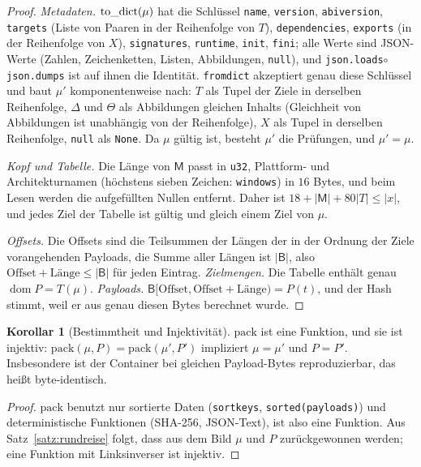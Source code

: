 \documentclass[a4paper,12pt,twoside]{report}
\DeclareRobustCommand{\_}{\ifmmode\mbox{\textunderscore}\else\textunderscore\allowbreak{}\fi}
\theoremstyle{definition}
\newtheorem{korollar}{Korollar}[chapter]
\newcommand{\dom}{\operatorname{dom}}
\begin{document}
\begin{proof}
	\emph{Metadaten.} $\mathrm{to\_dict}(\mu)$ hat die Schlüssel \texttt{name}, \texttt{version}, \texttt{abi\_version}, \texttt{targets} (Liste von Paaren in der Reihenfolge von $T$), \texttt{dependencies}, \texttt{exports} (in der Reihenfolge von $X$), \texttt{signatures}, \texttt{runtime}, \texttt{init}, \texttt{fini}; alle Werte sind JSON-Werte (Zahlen, Zeichenketten, Listen, Abbildungen, \texttt{null}), und \texttt{json.loads}$\circ$\texttt{json.dumps} ist auf ihnen die Identität. \texttt{from\_dict} akzeptiert genau diese Schlüssel und baut $\mu'$ komponentenweise nach: $T$ als Tupel der Ziele in derselben Reihenfolge, $\Delta$ und $\Theta$ als Abbildungen gleichen Inhalts (Gleichheit von Abbildungen ist unabhängig von der Reihenfolge), $X$ als Tupel in derselben Reihenfolge, \texttt{null} als \texttt{None}. Da $\mu$ gültig ist, besteht $\mu'$ die Prüfungen, und $\mu'=\mu$.

	\emph{Kopf und Tabelle.} Die Länge von $\mathsf M$ passt in \texttt{u32}, Plattform- und Architekturnamen (höchstens sieben Zeichen: \texttt{windows}) in $16$ Bytes, und beim Lesen werden die aufgefüllten Nullen entfernt. Daher ist $18+|\mathsf M|+80|T|\le|x|$, und jedes Ziel der Tabelle ist gültig und gleich einem Ziel von $\mu$.

	\emph{Offsets.} Die Offsets sind die Teilsummen der Längen der in der Ordnung der Ziele vorangehenden Payloads, die Summe aller Längen ist $|\mathsf B|$, also $\text{Offset}+\text{Länge}\le|\mathsf B|$ für jeden Eintrag. \emph{Zielmengen.} Die Tabelle enthält genau $\dom P=T(\mu)$. \emph{Payloads.} $\mathsf B[\text{Offset},\text{Offset}+\text{Länge})=P(t)$, und der Hash stimmt, weil er aus genau diesen Bytes berechnet wurde.
\end{proof}

\begin{korollar}[Bestimmtheit und Injektivität]
	\label{kor:inj}
	$\mathrm{pack}$ ist eine Funktion, und sie ist injektiv: $\mathrm{pack}(\mu,P)=\mathrm{pack}(\mu',P')$ impliziert $\mu=\mu'$ und $P=P'$. Insbesondere ist der Container bei gleichen Payload-Bytes reproduzierbar, das heißt byte-identisch.
\end{korollar}

\begin{proof}
	$\mathrm{pack}$ benutzt nur sortierte Daten (\texttt{sort\_keys}, \texttt{sorted(payloads)}) und deterministische Funktionen (SHA-256, JSON-Text), ist also eine Funktion. Aus Satz~\ref{satz:rundreise} folgt, dass aus dem Bild $\mu$ und $P$ zurückgewonnen werden; eine Funktion mit Linksinverser ist injektiv.
\end{proof}
\end{document}
